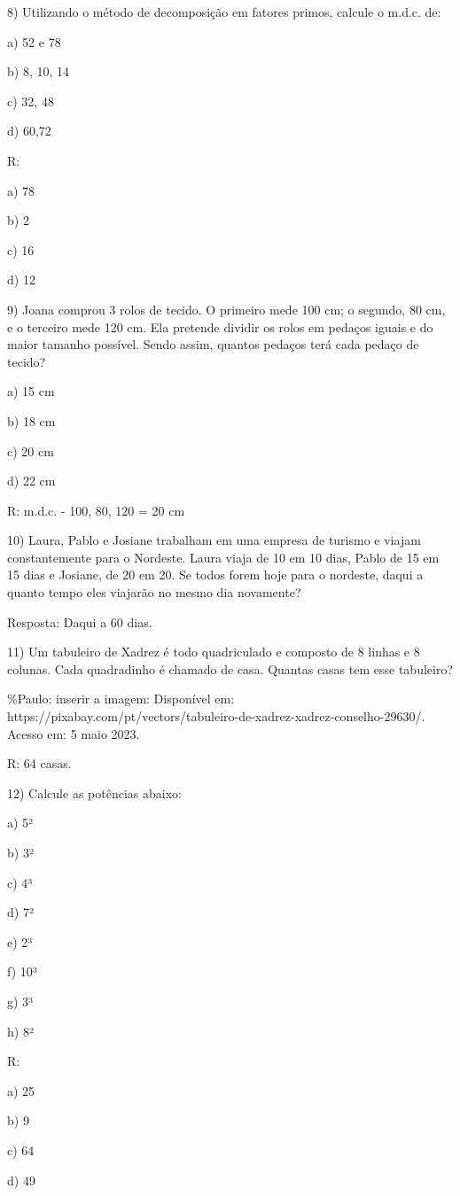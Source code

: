 8) Utilizando o método de decomposição em fatores primos, calcule o
m.d.c. de:

a) 52 e 78

b) 8, 10, 14

c) 32, 48

d) 60,72

R:

a) 78

b) 2

c) 16

d) 12

9) Joana comprou 3 rolos de tecido. O primeiro mede 100 cm; o segundo,
80 cm, e o terceiro mede 120 cm. Ela pretende dividir os rolos em
pedaços iguais e do maior tamanho possível. Sendo assim, quantos pedaços
terá cada pedaço de tecido?

a) 15 cm

b) 18 cm

c) 20 cm

d) 22 cm

R: m.d.c. - 100, 80, 120 = 20 cm

10) Laura, Pablo e Josiane trabalham em uma empresa de turismo e viajam
constantemente para o Nordeste. Laura viaja de 10 em 10 dias, Pablo de
15 em 15 dias e Josiane, de 20 em 20. Se todos forem hoje para o
nordeste, daqui a quanto tempo eles viajarão no mesmo dia novamente?

Resposta: Daqui a 60 dias.

11) Um tabuleiro de Xadrez é todo quadriculado e composto de 8 linhas e
8 colunas. Cada quadradinho é chamado de casa. Quantas casas tem esse
tabuleiro?

\%Paulo: inserir a imagem: Disponível em:
https://pixabay.com/pt/vectors/tabuleiro-de-xadrez-xadrez-conselho-29630/.
Acesso em: 5 maio 2023.

R: 64 casas.

12) Calcule as potências abaixo:

a) 5²

b) 3²

c) 4³

d) 7²

e) 2³

f) 10³

g) 3³

h) 8²

R:

a) 25

b) 9

c) 64

d) 49

